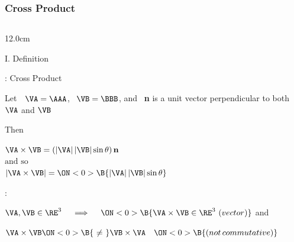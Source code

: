 \begin{frame}
\frametitle{Cross Product}
\begin{columns}
\begin{column}{12.0cm}

{I. Definition}

\vspace{0.2cm}

\scriptsize
	
: Cross Product

\vspace{0.3cm}

Let \,\, $\VA = \AAA$, \, $\VB = \BBB$, and \, {\bf n} is a unit vector perpendicular to both $\VA$ and $\VB$

\vspace{0.3cm}

Then 
\begin{center}
	$\VA \times \VB = (|\VA|\,|\VB|\sin \theta) \, {\bf n}$ \\
	\vspace{0.2cm}
	$\text{and so}$\\
	\vspace{0.2cm}
	$|\VA \times \VB| = \ON<0>{\B{|\VA|\,|\VB|\sin \theta}}$
\end{center}

\vspace{0.2cm}

:

\vspace{0.1cm}

\OBUL $\VA,\VB \in \RE^3 \quad \implies \quad 
\ON<0>{\B{\VA \times \VB \in \RE^3 \,\, (vector)}}$ and \,\,
\\

\vspace{0.2cm}

\OBUL $\VA \times \VB 
\ON<0>{\B{\,\,\ne\,\,}} \VB \times \VA \quad 
\ON<0>{\B{(not \, commutative)}}$ 

\vspace{0.2cm}


\end{column}
\end{columns}
\end{frame}
